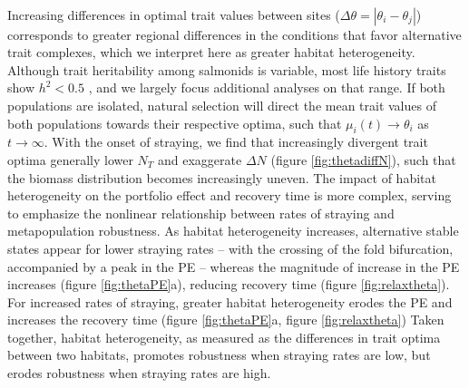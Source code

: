 \documentclass[twocolumn,preprintnumbers,amsmath,amssymb,superscriptaddress]{revtex4}
\begin{document}
\\ 
\noindent Increasing differences in optimal trait values between sites ($\Delta\theta = \left|\theta_i - \theta_j\right|$) corresponds to greater regional differences in the conditions that favor alternative trait complexes, which we interpret here as greater habitat heterogeneity.
Although trait heritability among salmonids is variable, most life history traits show $h^2 <0.5$ \cite{Carlson:2008hl}, and we largely focus additional analyses on that range.
If both populations are isolated, natural selection will direct the mean trait values of both populations towards their respective optima, such that $\mu_i(t) \rightarrow \theta_i$ as $t\rightarrow\infty$.
With the onset of straying, we find that increasingly divergent trait optima generally lower $N_T$ and exaggerate $\Delta N$ (figure \ref{fig:thetadiffN}), such that the biomass distribution becomes increasingly uneven. %
The impact of habitat heterogeneity on the portfolio effect and recovery time is more complex, serving to emphasize the nonlinear relationship between rates of straying and metapopulation robustness. %
As habitat heterogeneity increases, alternative stable states appear for lower straying rates -- with the crossing of the fold bifurcation, accompanied by a peak in the PE -- whereas the magnitude of increase in the PE increases (figure \ref{fig:thetaPE}a), reducing recovery time (figure \ref{fig:relaxtheta}).
For increased rates of straying, greater habitat heterogeneity erodes the PE and increases the recovery time (figure \ref{fig:thetaPE}a, figure \ref{fig:relaxtheta})
Taken together, habitat heterogeneity, as measured as the differences in trait optima between two habitats, promotes robustness when straying rates are low, but erodes robustness when straying rates are high.
\\
\end{document}
